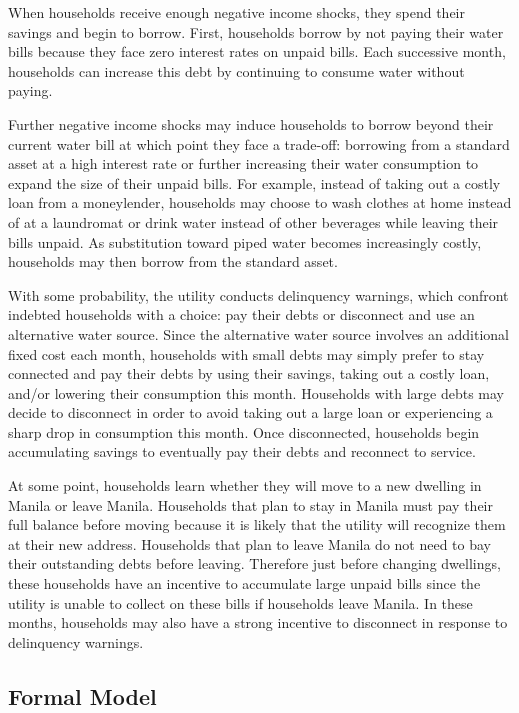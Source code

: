 \documentclass[12pt,table]{article}
\begin{document}
When households receive enough negative income shocks, they spend their savings and begin to borrow.  First, households borrow by not paying their water bills because they face zero interest rates on unpaid bills.  Each successive month, households can increase this debt by continuing to consume water without paying.

Further negative income shocks may induce households to borrow beyond their current water bill at which point they face a trade-off: borrowing from a standard asset at a high interest rate or further increasing their water consumption to expand the size of their unpaid bills.  For example, instead of taking out a costly loan from a moneylender, households may choose to wash clothes at home instead of at a laundromat or drink water instead of other beverages while leaving their bills unpaid.  As substitution toward piped water becomes increasingly costly, households may then borrow from the standard asset.

With some probability, the utility conducts delinquency warnings, which confront indebted households with a choice: pay their debts or disconnect and use an alternative water source.  Since the alternative water source involves an additional fixed cost each month, households with small debts may simply prefer to stay connected and pay their debts by using their savings, taking out a costly loan, and/or lowering their consumption this month.  Households with large debts may decide to disconnect in order to avoid taking out a large loan or experiencing a sharp drop in consumption this month.  Once disconnected, households begin accumulating savings to eventually pay their debts and reconnect to service.

At some point, households learn whether they will move to a new dwelling in Manila or leave Manila.  Households that plan to stay in Manila must pay their full balance before moving because it is likely that the utility will recognize them at their new address.  Households that plan to leave Manila do not need to bay their outstanding debts before leaving.  Therefore just before changing dwellings, these households have an incentive to accumulate large unpaid bills since the utility is unable to collect on these bills if households leave Manila.  In these months, households may also have a strong incentive to disconnect in response to delinquency warnings.

\subsection{Formal Model}
\end{document}
